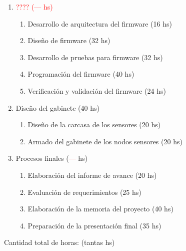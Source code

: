 \documentclass[
11pt, %
codirector, %
]{charter}
\begin{document}
\begin{enumerate}
\begin{enumerate}
	\end{enumerate}
\item \textcolor{red}{???? (--- hs)}
	\begin{enumerate}
	\item Desarrollo de arquitectura del firmware (16 hs)
	\item Diseño de firmware (32 hs)
	\item Desarrollo de pruebas para firmware (32 hs)
	\item Programación del firmware (40 hs)
	\item Verificación y validación del firmware (24 hs)
	\end{enumerate}
\item Diseño del gabinete (40 hs)
	\begin{enumerate}
	\item Diseño de la carcasa de los sensores (20 hs)
	\item Armado del gabinete de los nodos sensores (20 hs)
	\end{enumerate}
\item Procesos finales (\textcolor{red}{---} hs)
	\begin{enumerate}
	\item Elaboración del informe de avance (20 hs)
	\item Evaluación de requerimientos (25 hs)
	\item Elaboración de la memoria del proyecto (40 hs)
	\item Preparación de la presentación final (35 hs)
	\end{enumerate}
\end{enumerate}



Cantidad total de horas: (tantas hs)
\end{document}

